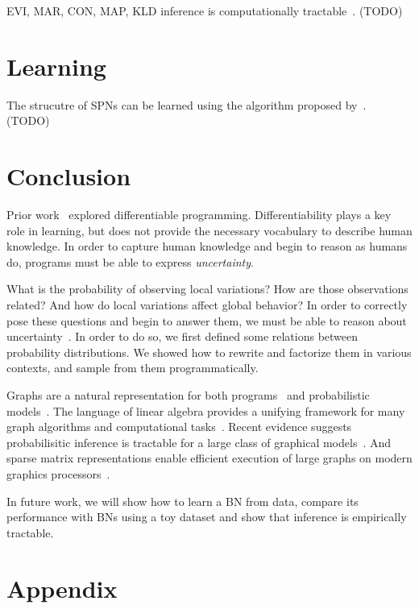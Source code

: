 \documentclass{article}
\begin{document}
EVI, MAR, CON, MAP, KLD inference is computationally tractable~\citep{choi2020probabilistic}. (TODO)

\section{Learning}

The strucutre of SPNs can be learned using the algorithm proposed by~\citet{gens2013learning}. (TODO)


\section{Conclusion}

Prior work~\citep{considine2019kotlingrad,considine2019programming} explored differentiable programming. Differentiability plays a key role in learning, but does not provide the necessary vocabulary to describe human knowledge. In order to capture human knowledge and begin to reason as humans do, programs must be able to express \textit{uncertainty}.

What is the probability of observing local variations? How are those observations related? And how do local variations affect global behavior? In order to correctly pose these questions and begin to answer them, we must be able to reason about uncertainty~\citep{pearl2014probabilistic}. In order to do so, we first defined some relations between probability distributions. We showed how to rewrite and factorize them in various contexts, and sample from them programmatically.

Graphs are a natural representation for both programs~\citep{allamanis2017learning} and probabilistic models~\citep{pearl2014probabilistic}. The language of linear algebra provides a unifying framework for many graph algorithms and computational tasks~\citep{kepner2011graph}. Recent evidence suggests probabilisitic inference is tractable for a large class of graphical models~\citep{choi2020probabilistic}. And sparse matrix representations enable efficient execution of large graphs on modern graphics processors~\citep{kepner2016mathematical}.

In future work, we will show how to learn a BN from data, compare its performance with BNs using a toy dataset and show that inference is empirically tractable.




\section{Appendix}\label{sec:appendix}
\end{document}
